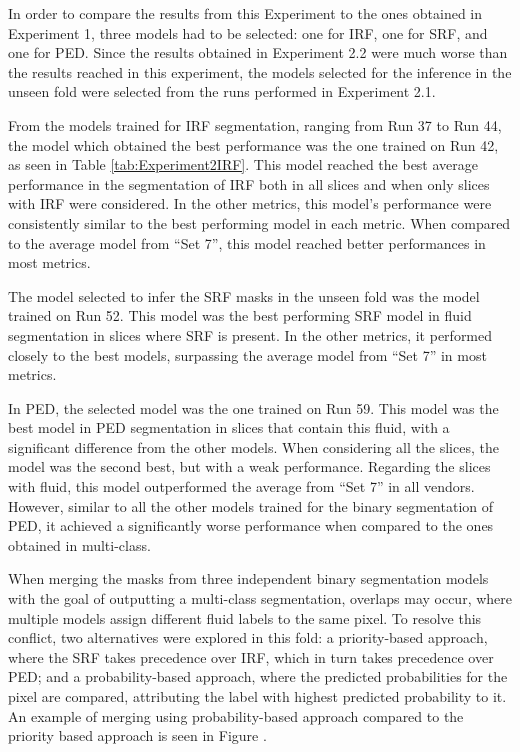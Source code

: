 In order to compare the results from this Experiment to the ones obtained in Experiment 1, three models had to be selected: one for IRF, one for SRF, and one for PED. Since the results obtained in Experiment 2.2 were much worse than the results reached in this experiment, the models selected for the inference in the unseen fold were selected from the runs performed in Experiment 2.1.
\par
From the models trained for IRF segmentation, ranging from Run 37 to Run 44, the model which obtained the best performance was the one trained on Run 42, as seen in Table \ref{tab:Experiment2IRF}. This model reached the best average performance in the segmentation of IRF both in all slices and when only slices with IRF were considered. In the other metrics, this model's performance were consistently similar to the best performing model in each metric. When compared to the average model from ``Set 7'', this model reached better performances in most metrics.
\par
The model selected to infer the SRF masks in the unseen fold was the model trained on Run 52. This model was the best performing SRF model in fluid segmentation in slices where SRF is present. In the other metrics, it performed closely to the best models, surpassing the average model from ``Set 7'' in most metrics.
\par
In PED, the selected model was the one trained on Run 59. This model was the best model in PED segmentation in slices that contain this fluid, with a significant difference from the other models. When considering all the slices, the model was the second best, but with a weak performance. Regarding the slices with fluid, this model outperformed the average from ``Set 7'' in all vendors. However, similar to all the other models trained for the binary segmentation of PED, it achieved a significantly worse performance when compared to the ones obtained in multi-class.
\par
When merging the masks from three independent binary segmentation models with the goal of outputting a multi-class segmentation, overlaps may occur, where multiple models assign different fluid labels to the same pixel. To resolve this conflict, two alternatives were explored in this fold: a priority-based approach, where the SRF takes precedence over IRF, which in turn takes precedence over PED; and a probability-based approach, where the predicted probabilities for the pixel are compared, attributing the label with highest predicted probability to it. An example of merging using probability-based approach compared to the priority based approach is seen in Figure .


